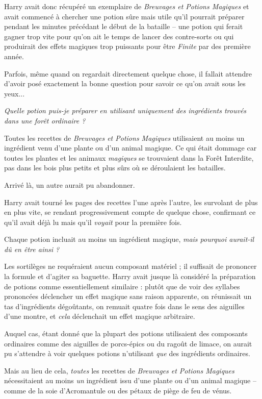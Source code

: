 Harry avait donc récupéré un exemplaire de \emph{Breuvages et Potions Magiques}  et avait commencé à chercher une potion sûre mais utile qu'il pourrait préparer pendant les minutes précédant le début de la bataille – une potion qui ferait gagner trop vite pour qu'on ait le temps de lancer des contre-sorts ou qui produirait des effets magiques trop puissants pour être \emph{Finite}  par des première année.

Parfois, même quand on regardait directement quelque chose, il fallait attendre d'avoir posé exactement la bonne question pour savoir ce qu'on avait sous les yeux...

\emph{Quelle potion puis-je préparer en utilisant uniquement des ingrédients trouvés dans une forêt ordinaire ?} 

Toutes les recettes de \emph{Breuvages et Potions Magiques}  utilisaient au moins un ingrédient venu d'une plante ou d'un animal magique. Ce qui était dommage car toutes les plantes et les animaux \emph{magiques}  se trouvaient dans la Forêt Interdite, pas dans les bois plus petits et plus sûrs où se déroulaient les batailles.

Arrivé là, un autre aurait pu abandonner.

Harry avait tourné les pages des recettes l'une après l'autre, les survolant de plus en plus vite, se rendant progressivement compte de quelque chose, confirmant ce qu'il avait déjà lu mais qu'il \emph{voyait}  pour la première fois.

Chaque potion incluait au moins un ingrédient magique, \emph{mais pourquoi aurait-il dû en être ainsi ?} 

Les sortilèges ne requéraient aucun composant matériel ; il suffisait de prononcer la formule et d'agiter sa baguette. Harry avait jusque là considéré la préparation de potions comme essentiellement similaire : plutôt que de voir des syllabes prononcées déclencher un effet magique sans raison apparente, on réunissait un tas d'ingrédients dégoûtants, on remuait quatre fois dans le sens des aiguilles d'une montre, et \emph{cela}  déclenchait un effet magique arbitraire.

Auquel cas, étant donné que la plupart des potions utilisaient des composants ordinaires comme des aiguilles de porcs-épics ou du ragoût de limace, on aurait pu s'attendre à voir quelques potions n'utilisant \emph{que}  des ingrédients ordinaires.

Mais au lieu de cela, \emph{toutes}  les recettes de \emph{Breuvages et Potions Magiques}  nécessitaient au moins \emph{un}  ingrédient issu d'une plante ou d'un animal magique – comme de la soie d'Acromantule ou des pétaux de piège de feu de vénus.

